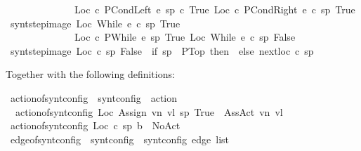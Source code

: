 \begin{isabellebody}
\ \ \ \ \ \ \ \ \ \ \ \ \ \ {\isacharbrackleft}{\isacharparenleft}Loc\ c{}\ {\isacharparenleft}PCondLeft\ e\ sp\ c{}{\isacharparenright}{\isacharcomma}\ True{\isacharparenright}{\isacharcomma}\ {\isacharparenleft}Loc\ c{}\ {\isacharparenleft}PCondRight\ e\ c{}\ sp{\isacharparenright}{\isacharcomma}\ True{\isacharparenright}{\isacharbrackright}{\isachardoublequoteclose}\isanewline
{\isacharbar}\ {\isachardoublequoteopen}synt{\isacharunderscore}step{\isacharunderscore}image\ {\isacharparenleft}Loc\ {\isacharparenleft}While\ e\ c{\isacharparenright}\ sp{\isacharcomma}\ True{\isacharparenright}\ {\isacharequal}\ \isanewline
\ \ \ \ \ \ \ \ \ \ \ \ \ \ {\isacharbrackleft}{\isacharparenleft}Loc\ c\ {\isacharparenleft}PWhile\ e\ sp{\isacharparenright}{\isacharcomma}\ True{\isacharparenright}{\isacharcomma}\ {\isacharparenleft}Loc\ {\isacharparenleft}While\ e\ c{\isacharparenright}\ sp{\isacharcomma}\ False{\isacharparenright}{\isacharbrackright}{\isachardoublequoteclose}\isanewline
{\isacharbar}\ {\isachardoublequoteopen}synt{\isacharunderscore}step{\isacharunderscore}image\ {\isacharparenleft}Loc\ c\ sp{\isacharcomma}\ False{\isacharparenright}\ {\isacharequal}\ {\isacharparenleft}if\ sp\ {\isacharequal}\ PTop\ then\ {\isacharbrackleft}{\isacharbrackright}\ else\ {\isacharbrackleft}next{\isacharunderscore}loc\ c\ sp{\isacharbrackright}{\isacharparenright}{\isachardoublequoteclose}\begin{isamarkuptext}Together with the following definitions:\end{isamarkuptext}\isamarkuptrue {}\isamarkupfalse \ action{\isacharunderscore}of{\isacharunderscore}synt{\isacharunderscore}config\ {\isacharcolon}{\isacharcolon}\ {\isachardoublequoteopen}synt{\isacharunderscore}config\ {\isasymRightarrow}\ action{\isachardoublequoteclose}\ \isanewline
\ \ {\isachardoublequoteopen}action{\isacharunderscore}of{\isacharunderscore}synt{\isacharunderscore}config\ {\isacharparenleft}Loc\ {\isacharparenleft}Assign\ vn\ vl{\isacharparenright}\ sp{\isacharcomma}\ True{\isacharparenright}\ {\isacharequal}\ AssAct\ vn\ vl{\isachardoublequoteclose}\isanewline
{\isacharbar}\ {\isachardoublequoteopen}action{\isacharunderscore}of{\isacharunderscore}synt{\isacharunderscore}config\ {\isacharparenleft}Loc\ c\ sp{\isacharcomma}\ b{\isacharparenright}\ {\isacharequal}\ NoAct{\isachardoublequoteclose}\isanewline
\isanewline
{}\isamarkupfalse \ edge{\isacharunderscore}of{\isacharunderscore}synt{\isacharunderscore}config\ {\isacharcolon}{\isacharcolon}\ {\isachardoublequoteopen}synt{\isacharunderscore}config\ {\isasymRightarrow}\ synt{\isacharunderscore}config\ edge\ list{\isachardoublequoteclose}\ \isanewline

\end{isabellebody}
